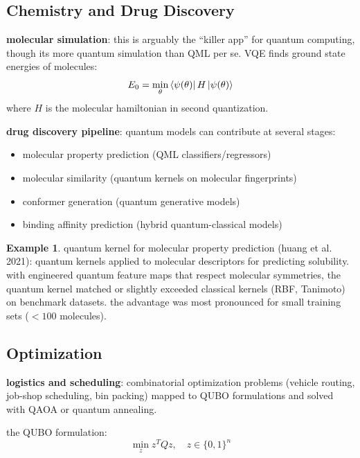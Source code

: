 \documentclass[11pt,a4paper]{article}
\theoremstyle{definition}
\newtheorem{example}{Example}[section]
\theoremstyle{remark}
\begin{document}
\subsection{Chemistry and Drug Discovery}

\textbf{molecular simulation}: this is arguably the ``killer app'' for quantum computing, though its more quantum simulation than QML per se. VQE finds ground state energies of molecules:
\begin{equation}
    E_0 = \min_\theta \bra{\psi(\theta)} H \ket{\psi(\theta)}
\end{equation}
where $H$ is the molecular hamiltonian in second quantization.

\textbf{drug discovery pipeline}: quantum models can contribute at several stages:
\begin{itemize}
    \item molecular property prediction (QML classifiers/regressors)
    \item molecular similarity (quantum kernels on molecular fingerprints)
    \item conformer generation (quantum generative models)
    \item binding affinity prediction (hybrid quantum-classical models)
\end{itemize}

\begin{example}
quantum kernel for molecular property prediction (huang et al. 2021): quantum kernels applied to molecular descriptors for predicting solubility. with engineered quantum feature maps that respect molecular symmetries, the quantum kernel matched or slightly exceeded classical kernels (RBF, Tanimoto) on benchmark datasets. the advantage was most pronounced for small training sets ($< 100$ molecules).
\end{example}

\subsection{Optimization}

\textbf{logistics and scheduling}: combinatorial optimization problems (vehicle routing, job-shop scheduling, bin packing) mapped to QUBO formulations and solved with QAOA or quantum annealing.

the QUBO formulation:
\begin{equation}
    \min_z z^T Q z, \quad z \in \{0, 1\}^n
\end{equation}
\end{document}
